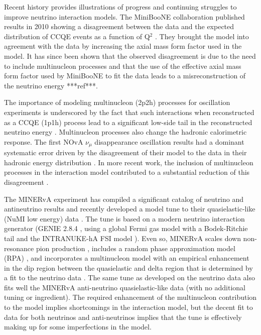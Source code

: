 Recent history provides illustrations of progress and continuing struggles to improve neutrino interaction models.  The MiniBooNE collaboration published results in 2010 showing a disagreement between the data and the expected distribution of CCQE events as a function of Q$^{2}$ \cite{AguilarArevalo:2010cx}.  They brought the model into agreement with the data by increasing the axial mass form factor used in the model.  It has since been shown that the observed disagreement is due to the need to include multinucleon processes and that the use of the effective axial mass form factor used by MiniBooNE to fit the data leads to a misreconstruction of the neutrino energy ***ref***.  

The importance of modeling multinucleon (2p2h) processes for oscillation experiments is underscored by the fact that such interactions when reconstructed as a CCQE (1p1h) process lead to a significant low-side tail in the reconstructed neutrino energy \cite{Martini:2012uc}.  Multinucleon processes also change the hadronic calorimetric response.  The first NOvA $\nu_{\mu}$ disappearance oscillation results had a dominant systematic error driven by the disagreement of their model to the data in their hadronic energy distribution \cite{Adamson:2016xxw}.  In more recent work, the inclusion of multinucleon processes in the interaction model contributed to a substantial reduction of this disagreement \cite{NOvA:2018gge}.

The MINERvA experiment has compiled a significant catalog of neutrino and antineutrino results and recently developed a model tune to their quasielastic-like  (NuMI low energy) data \cite{Ruterbories:2018gub}.  The tune is based on a modern neutrino interaction generator (GENIE 2.8.4 \cite{Andreopoulos:2009rq}, using a global Fermi gas model \cite{Smith:1972xh}  with a Bodek-Ritchie tail \cite{Bodek:1981wr} and the INTRANUKE-hA FSI model \cite{Dytman:2007zz}).  Even so, MINERvA scales down non-resonance pion production \cite{Rodrigues:2016xjj}, includes a random phase approximation model (RPA) \cite{Nieves:2004wx,Gran:2017psn}, and incorporates a multinucleon model \cite{Nieves:2011pp, Gran:2013kda, Schwehr:2016pvn} with an empirical enhancement in the dip region between the quasielastic and delta region that is determined by a fit to the neutrino data \cite{Ruterbories:2018gub}.  The same tune as developed on the neutrino data also fits well the MINERvA anti-neutrino quasielastic-like data (with no additional tuning or ingredient).  The required enhancement of the multinucleon contribution to the model implies shortcomings in the interaction model, but the decent fit to data for both neutrinos and anti-neutrinos implies that the tune is effectively making up for some imperfections in the model. 

